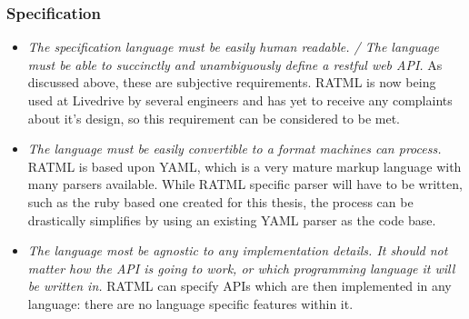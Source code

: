 \subsubsection{Specification}
\begin{itemize}
\item \emph{The specification language must be easily human readable. / The language must be able to succinctly and unambiguously define a restful web API.} As discussed above, these are subjective requirements. RATML is now being used at Livedrive by several engineers and has yet to receive any complaints about it's design, so this requirement can be considered to be met.
\item \emph{The language must be easily convertible to a format machines can process.} RATML is based upon YAML, which is a very mature markup language with many parsers available.  While RATML specific parser will have to be written, such as the ruby based one created for this thesis, the process can be drastically simplifies by using an existing YAML parser as the code base.
\item \emph{The language most be agnostic to any implementation details. It should not matter how the API is going to work, or which programming language it will be written in.} RATML can specify APIs which are then implemented in any language: there are no language specific features within it.
\end{itemize}

